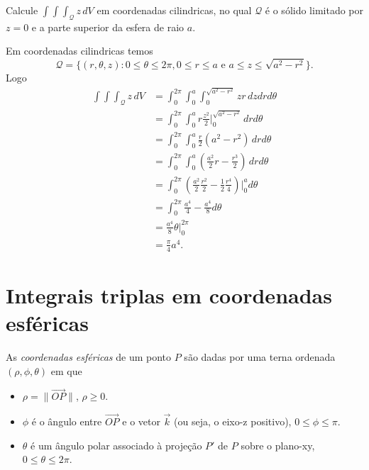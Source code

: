 \begin{example}
    Calcule \(\int\int\int_\mathcal{Q} z\, dV\) em coordenadas cilindricas, no qual \(\mathcal{Q}\) é o sólido limitado por \(z=0\) e a parte superior da esfera de raio \(a\).

    Em coordenadas cilindricas temos
        \[\mathcal{Q} = \{(r,\theta,z) : 0\leq \theta\leq 2\pi, 0\leq r\leq a \text{ e } a\leq z\leq \sqrt{a^2 - r^2}\}.\] Logo
            \begin{align*}
                \int\int\int_\mathcal{Q} z\, dV
                    & = \int_0^{2\pi} \int_0^a \int_0^{\sqrt{a^2 - r^2}} z r \, dz dr d\theta \\
                    & = \int_0^{2\pi} \int_0^a r \frac{z^2}{2}\bigg|_0^{\sqrt{a^2 - r^2}} \, dr d\theta \\
                    & = \int_0^{2\pi} \int_0^a \frac{r}{2} (a^2 - r^2)\, dr d\theta \\
                    & = \int_0^{2\pi} \int_0^a \left( \frac{a^2}{2}r - \frac{r^3}{2} \right) \, dr d\theta \\
                    & = \int_0^{2\pi} \left( \frac{a^2}{2} \frac{r^2}{2} - \frac{1}{2} \frac{r^4}{4} \right)\bigg|_0^a d\theta \\
                    & = \int_0^{2\pi} \frac{a^4}{4} - \frac{a^4}{8} d\theta \\
                    & = \frac{a^4}{8} \theta\bigg|_0^{2\pi} \\
                    & = \frac{\pi}{4} a^4.
            \end{align*}
\end{example}

\section{Integrais triplas em coordenadas esféricas}

As \textit{coordenadas esféricas} de um ponto \(P\) são dadas por uma terna ordenada \((\rho,\phi,\theta)\) em que
    \begin{itemize}
        \item \(\rho = \|\overrightarrow{OP}\|\), \(\rho\geq 0\).
        \item \(\phi\) é o ângulo entre \(\overrightarrow{OP}\) e o vetor \(\overrightarrow{k}\) (ou seja, o eixo-z positivo), \(0\leq \phi\leq \pi\).
        \item \(\theta\) é um ângulo polar associado à projeção \(P'\) de \(P\) sobre o plano-xy, \(0\leq \theta\leq 2\pi\).
    \end{itemize}

